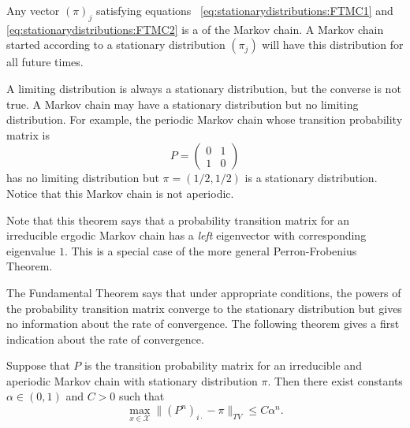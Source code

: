 \documentclass[12pt]{article}
\begin{document}
\begin{definition}
    Any vector \( (\pi)_{j} \) satisfying equations~%
    \ref{eq:stationarydistributions:FTMC1} and~%
    \ref{eq:stationarydistributions:FTMC2} is a  of the Markov chain.  A Markov chain
    started according to a stationary distribution \( (\pi_j) \) will
    have this distribution for all future times.
\end{definition}

\begin{remark}
    A limiting distribution is always a stationary distribution, but the
    converse is not true.  A Markov chain may have a stationary
    distribution but no limiting distribution.  For example, the
    periodic Markov chain whose transition probability matrix is
    \[
        P =
        \begin{pmatrix}
            0 & 1 \\
            1 & 0
        \end{pmatrix}
    \] has no limiting distribution but \( \pi = (1/2, 1/2) \) is a
    stationary distribution.  Notice that this Markov chain is not
    aperiodic.%
\end{remark}

\begin{remark}
    Note that this theorem says that a probability transition matrix for
    an irreducible ergodic Markov chain has a \emph{left} eigenvector
    with corresponding eigenvalue \( 1 \).  This is a special case of
    the more general Perron-Frobenius Theorem.
\end{remark}

\begin{remark}
    The Fundamental Theorem says that under appropriate conditions, the
    powers of the probability transition matrix converge to the
    stationary distribution but gives no information about the rate of
    convergence.  The following theorem gives a first indication about
    the rate of convergence.
\end{remark}

\begin{theorem}
    Suppose that \( P \) is the transition probability matrix for an
    irreducible and aperiodic Markov chain with stationary distribution \(
    \pi \).  Then there exist constants \( \alpha \in (0,1) \) and \( C
    > 0 \) such that
    \[
        \max_{x \in \mathcal{X}} \| (P^n)_{i \cdot} - \pi \|_{TV} \le C
        \alpha^n.
    \]
\end{theorem}
\end{document}
